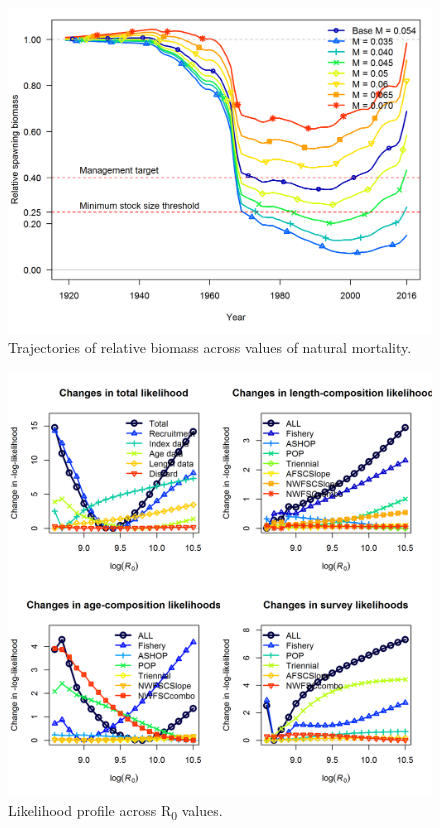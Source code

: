 \documentclass[12pt,]{article}
\begin{document}
\FloatBarrier

\begin{figure}
\centering
\includegraphics{Figures/m_trajectories.png}
\caption{Trajectories of relative biomass across values of natural
mortality. \label{fig:m_trajectory}}
\end{figure}

\FloatBarrier

\begin{figure}
\centering
\includegraphics{Figures/piner_panel_R0.png}
\caption{Likelihood profile across R\textsubscript{0} values.
\label{fig:piner_R0}}
\end{figure}
\end{document}
